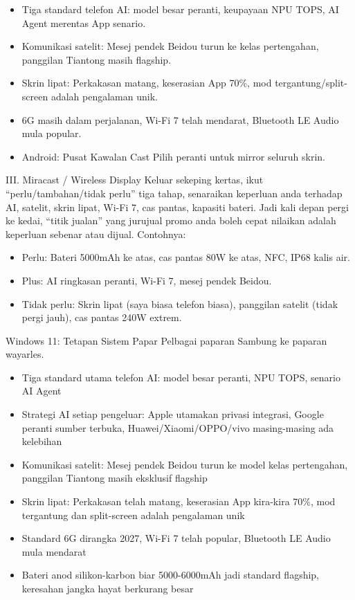 
\begin{itemize}
  \item Tiga standard telefon AI: model besar peranti, keupayaan NPU TOPS, AI Agent merentas App senario.
  \item Komunikasi satelit: Mesej pendek Beidou turun ke kelas pertengahan, panggilan Tiantong masih flagship.
  \item Skrin lipat: Perkakasan matang, keserasian App 70\%, mod tergantung/split-screen adalah pengalaman unik.
  \item 6G masih dalam perjalanan, Wi-Fi 7 telah mendarat, Bluetooth LE Audio mula popular.
  \item Android: Pusat Kawalan Cast Pilih peranti untuk mirror seluruh skrin.
\end{itemize}

\begin{tcbpractice}{III. Miracast / Wireless Display}
Keluar sekeping kertas, ikut “perlu/tambahan/tidak perlu” tiga tahap, senaraikan keperluan anda terhadap AI, satelit, skrin lipat, Wi-Fi 7, cas pantas, kapasiti bateri. Jadi kali depan pergi ke kedai, “titik jualan” yang jurujual promo anda boleh cepat nilaikan adalah keperluan sebenar atau dijual. Contohnya:

\begin{itemize}
  \item Perlu: Bateri 5000mAh ke atas, cas pantas 80W ke atas, NFC, IP68 kalis air.
  \item Plus: AI ringkasan peranti, Wi-Fi 7, mesej pendek Beidou.
  \item Tidak perlu: Skrin lipat (saya biasa telefon biasa), panggilan satelit (tidak pergi jauh), cas pantas 240W extrem.
\end{itemize}

\end{tcbpractice}

\begin{tcbsummary}{Windows 11: Tetapan Sistem Papar Pelbagai paparan Sambung ke paparan wayarles.}
\begin{itemize}
  \item Tiga standard utama telefon AI: model besar peranti, NPU TOPS, senario AI Agent
  \item Strategi AI setiap pengeluar: Apple utamakan privasi integrasi, Google peranti sumber terbuka, Huawei/Xiaomi/OPPO/vivo masing-masing ada kelebihan
  \item Komunikasi satelit: Mesej pendek Beidou turun ke model kelas pertengahan, panggilan Tiantong masih eksklusif flagship
  \item Skrin lipat: Perkakasan telah matang, keserasian App kira-kira 70\%, mod tergantung dan split-screen adalah pengalaman unik
  \item Standard 6G dirangka 2027, Wi-Fi 7 telah popular, Bluetooth LE Audio mula mendarat
  \item Bateri anod silikon-karbon biar 5000-6000mAh jadi standard flagship, keresahan jangka hayat berkurang besar
\end{itemize}

\end{tcbsummary}
